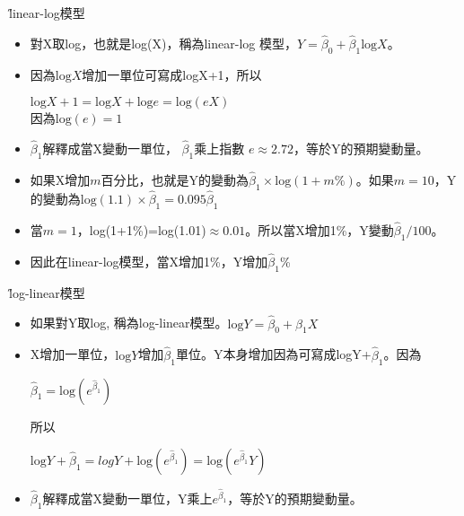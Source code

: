 \documentclass[xcolor=dvipsnames]{beamer}
\begin{document}
\begin{frame}{\H linear-log模型}
\begin{itemize}
\item 對X取log，也就是log(X)，稱為linear-log 模型，$Y=\hat{\beta}_{0}+\hat{\beta}_{1}\mathrm{log}X$。
\item 因為$\mathrm{log}X$增加一單位可寫成logX+1，所以
\begin{center}
$\mathrm{log}X+1=\mathrm{log}X+\mathrm{log}e=\mathrm{log}(eX)$\\
因為$ \mathrm{log}(e)=1 $
\end{center}
\item $\hat{\beta}_{1}$解釋成當X變動一單位， $\hat{\beta}_{1}$乘上指數
$e \approx 2.72$，等於Y的預期變動量。
\item 如果X增加$m$百分比，也就是Y的變動為$\hat{\beta}_{1}\times \mathrm{log}(1+m\%)$。如果$ m=10 $，Y的變動為$ \mathrm{log}(1.1)\times\hat{\beta}_{1}=0.095\hat{\beta}_{1} $
\item 當$m=1$，log(1+1\%)=log(1.01)$ \approx 0.01$。所以當X增加1\%，Y變動$ \hat{\beta}_{1}/100 $。
\item 因此在linear-log模型，當X增加1\%，Y增加$ \hat{\beta}_{1}$\%
\end{itemize}
\end{frame}

\begin{frame}{\H log-linear模型}
\begin{itemize}
\item 如果對Y取log, 稱為log-linear模型。$\mathrm{log}Y=\hat{\beta}_{0}+\hat{\beta}_{1}X  $
\item X增加一單位，$\mathrm{log}Y$增加$\hat{\beta}_{1}$單位。Y本身增加因為可寫成logY+$\hat{\beta}_{1}$。因為
\begin{center}
$\hat{\beta}_{1}=\mathrm{log}(e^{\hat{\beta}_{1}})$\\
\end{center}
所以
\begin{center}
$\mathrm{log}Y+\hat{\beta}_{1}=logY+\mathrm{log}(e^{\hat{\beta}_{1}})=\mathrm{log}(e^{\hat{\beta}_{1}}Y)$\\
\end{center}
\item $\hat{\beta}_{1}$解釋成當X變動一單位，Y乘上$e^{\hat{\beta}_{1}}  $，等於Y的預期變動量。
\end{itemize}
\end{frame}
\end{document}
